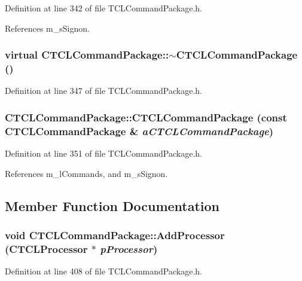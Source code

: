 Definition at line 342 of file TCLCommand\-Package.h.

References m\_\-s\-Signon.
\subsubsection{\setlength{\rightskip}{0pt plus 5cm}virtual CTCLCommand\-Package::$\sim$CTCLCommand\-Package ()\hspace{0.3cm}{\tt  [inline, virtual]}}\label{classCTCLCommandPackage_a2}




Definition at line 347 of file TCLCommand\-Package.h.
\subsubsection{\setlength{\rightskip}{0pt plus 5cm}CTCLCommand\-Package::CTCLCommand\-Package (const CTCLCommand\-Package \& {\em a\-CTCLCommand\-Package})\hspace{0.3cm}{\tt  [inline]}}\label{classCTCLCommandPackage_a3}




Definition at line 351 of file TCLCommand\-Package.h.

References m\_\-l\-Commands, and m\_\-s\-Signon.

\subsection{Member Function Documentation}
\subsubsection{\setlength{\rightskip}{0pt plus 5cm}void CTCLCommand\-Package::Add\-Processor ({\bf CTCLProcessor} $\ast$ {\em p\-Processor})\hspace{0.3cm}{\tt  [inline]}}\label{classCTCLCommandPackage_a10}




Definition at line 408 of file TCLCommand\-Package.h.

